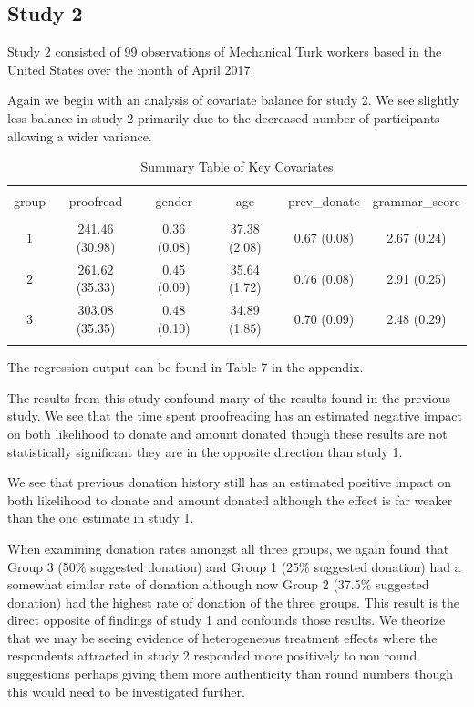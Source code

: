 \documentclass[]{article}
\begin{document}
\subsection{Study 2}\label{study-2-1}

Study 2 consisted of 99 observations of Mechanical Turk workers based in
the United States over the month of April 2017.

Again we begin with an analysis of covariate balance for study 2. We see
slightly less balance in study 2 primarily due to the decreased number
of participants allowing a wider variance.

\begin{table}[!htbp] \centering 
  \caption{Summary Table of Key Covariates} 
  \label{} 
\begin{tabular}{@{\extracolsep{5pt}} cccccc} 
\\[-1.8ex]\hline 
\hline \\[-1.8ex] 
group & proofread & gender & age & prev\_donate & grammar\_score \\ 
\hline \\[-1.8ex] 
$1$ & 241.46 (30.98) & 0.36 (0.08) & 37.38 (2.08) & 0.67 (0.08) & 2.67 (0.24) \\ 
$2$ & 261.62 (35.33) & 0.45 (0.09) & 35.64 (1.72) & 0.76 (0.08) & 2.91 (0.25) \\ 
$3$ & 303.08 (35.35) & 0.48 (0.10) & 34.89 (1.85) & 0.70 (0.09) & 2.48 (0.29) \\ 
\hline \\[-1.8ex] 
\end{tabular} 
\end{table}

The regression output can be found in Table 7 in the appendix.

The results from this study confound many of the results found in the
previous study. We see that the time spent proofreading has an estimated
negative impact on both likelihood to donate and amount donated though
these results are not statistically significant they are in the opposite
direction than study 1.

We see that previous donation history still has an estimated positive
impact on both likelihood to donate and amount donated although the
effect is far weaker than the one estimate in study 1.

When examining donation rates amongst all three groups, we again found
that Group 3 (50\% suggested donation) and Group 1 (25\% suggested
donation) had a somewhat similar rate of donation although now Group 2
(37.5\% suggested donation) had the highest rate of donation of the
three groups. This result is the direct opposite of findings of study 1
and confounds those results. We theorize that we may be seeing evidence
of heterogeneous treatment effects where the respondents attracted in
study 2 responded more positively to non round suggestions perhaps
giving them more authenticity than round numbers though this would need
to be investigated further.
\end{document}
